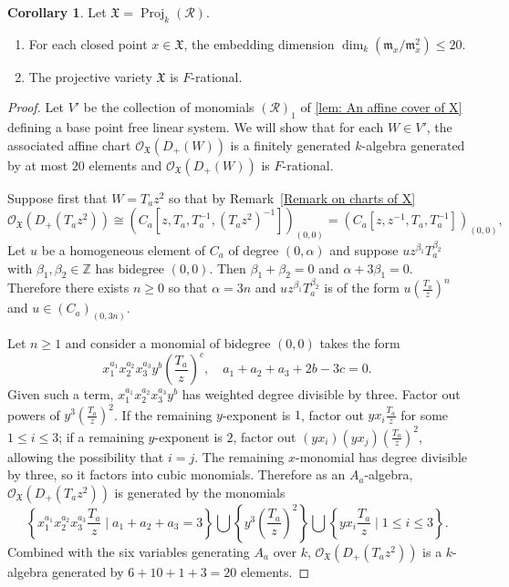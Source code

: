 \documentclass[reqno,11pt]{amsart}
\numberwithin{equation}{section}
\theoremstyle{definition}
\theoremstyle{definition}
\newtheorem{corollary}[theorem]{Corollary}
\theoremstyle{definition}
\theoremstyle{remark}
\newcommand{\Proj}{\operatorname{Proj}}
\newcommand{\Z}{\mathbb{Z}}
\newcommand{\fm}{\mathfrak{m}}
\newcommand{\cO}{\mathcal{O}}
\begin{document}
\begin{corollary}
    \label{cor: X is F-rational}
    Let $\mathfrak{X} = \Proj_k(\mathcal{R})$.
    \begin{enumerate}[label=(\alph*)]
        \item For each closed point $x\in \mathfrak{X}$, the embedding dimension $\dim_k(\fm_x/\fm_{x}^2)\leq 20$.
        \item The projective variety $\mathfrak{X}$ is $F$-rational.
    \end{enumerate}
\end{corollary}

\begin{proof}
    Let $V'$ be the collection of monomials $(\mathcal{R})_{1}$ of \cref{lem: An affine cover of X} defining a base point free linear system. We will show that for each $W\in V'$, the associated affine chart $\cO_{\mathfrak{X}}(D_+(W))$ is a finitely generated $k$-algebra generated by at most $20$ elements and $\cO_{\mathfrak{X}}(D_+(W))$ is $F$-rational.


    Suppose first that $W = T_az^2$ so that by Remark~\ref{Remark on charts of X}
    \[
    \cO_\mathfrak{X}(D_+(T_az^2))
    \cong
    \left(C_a\left[z,T_a,T_a^{-1},(T_az^2)^{-1}\right]\right)_{(0,0)} = \left(C_a\left[z,z^{-1},T_a,T_a^{-1}\right]\right)_{(0,0)},
    \]
    Let $u$ be a homogeneous element of $C_a$ of degree $(0,\alpha)$ and suppose $uz^{\beta_1}T_a^{\beta_2}$ with $\beta_1,\beta_2\in \Z$ has bidegree $(0,0)$. Then $\beta_1+\beta_2 = 0$ and $\alpha + 3\beta_1 = 0$. Therefore there exists $n\geq 0$ so that $\alpha = 3n$ and $uz^{\beta_1}T_a^{\beta_2}$ is of the form $u\left(\frac{T_a}{z}\right)^{n}$ and $u\in (C_a)_{(0,3n)}$. 
    
    Let $n\geq 1$ and consider a monomial of bidegree $(0,0)$ takes the form
    \[
    x_1^{a_1}x_2^{a_2}x_3^{a_3}y^b\left(\frac{T_a}{z}\right)^c, \quad a_1+a_2+a_3+2b -3c = 0.
    \]
    Given such a term, $x_1^{a_1}x_2^{a_2}x_3^{a_3}y^b$ has weighted degree divisible by three. Factor out powers of $y^3\left(\frac{T_a}{z}\right)^2$. If the remaining $y$-exponent is $1$, factor out $yx_i\frac{T_a}{z}$ for some $1\leq i\leq 3$; if a remaining $y$-exponent is $2$, factor out $(yx_i)(yx_j)\left(\frac{T_a}{z}\right)^2$, allowing the possibility that $i=j$. The remaining $x$-monomial has degree divisible by three, so it factors into cubic monomials. Therefore as an $A_a$-algebra, $\cO_\mathfrak{X}(D_+(T_az^2))$ is generated by the monomials
    \[
    \left\{x_1^{a_1}x_2^{a_2}x_3^{a_3}\frac{T_a}{z}\mid a_1+a_2+a_3 = 3\right\} \bigcup \left\{y^3\left(\frac{T_a}{z}\right)^2\right\}\bigcup\left\{yx_i\frac{T_a}{z}\mid 1\leq i\leq 3\right\}.
    \]
    Combined with the six variables generating $A_a$ over $k$, $\cO_\mathfrak{X}(D_+(T_az^2))$ is a $k$-algebra generated by $6+10+1+3=20$ elements.
    

\end{proof}
\end{document}
